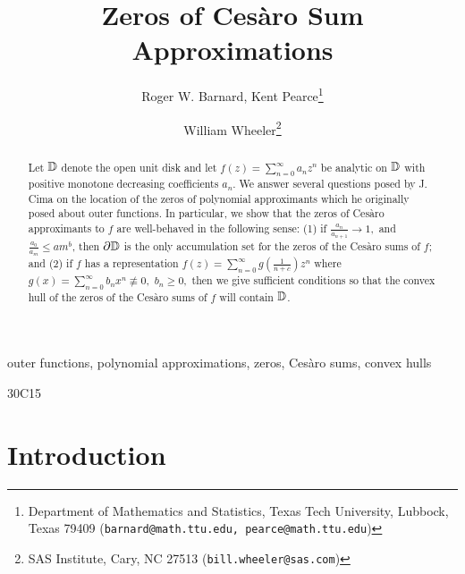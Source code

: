 \documentclass[final]{siamltex}
\title{\large Zeros of Ces\`{a}ro Sum Approximations}
\author{Roger W. Barnard, Kent Pearce\thanks{Department of 
Mathematics and Statistics,  Texas Tech University, 
Lubbock, Texas  79409 
({\tt barnard@math.ttu.edu, pearce@math.ttu.edu}) }
\and William Wheeler\thanks {SAS Institute, 
Cary, NC  27513
({\tt bill.wheeler@sas.com})}}
\begin{document}
\maketitle 

\begin{abstract}

Let ${\Bbb D}$ denote the open unit disk and let $f(z) = \sum_{n=0}^{\infty} a_{n} z^{n}$  be analytic on ${\Bbb D}$ with positive monotone decreasing coefficients  $a_{n}$.  We answer several questions posed by J. Cima on the location of the zeros of polynomial approximants which he originally posed about outer functions.  In particular, we show that the zeros of Ces\`{a}ro approximants to $f$ are well-behaved in the following sense:  (1) if $\frac{a_{n}}{a_{n+1}} \rightarrow 1,$ and  $\frac{a_{0}}{a_{m}} \leq am^{b}$, then $\partial{\Bbb D}$ is the only accumulation set for the zeros of the Ces\`{a}ro sums of $f$; and (2) if $f$ has a representation $ f(z) = \sum_{n=0}^{\infty} g \left( \frac{1}{n+c} \right) z^{n}$  where $g(x) = \sum_{n=0}^{\infty}b_{n}x^{n} \not\equiv 0,$ $b_{n} \geq 0,$ then we give sufficient conditions so that the convex hull of the zeros of the Ces\`{a}ro sums of $f$ will contain ${\Bbb D}$.
\end{abstract}


\begin{keywords} 
outer functions, polynomial approximations, zeros, Ces\`{a}ro sums, convex hulls
\end{keywords}

\begin{AMS}
30C15 
\end{AMS}

\pagestyle{myheadings}
\thispagestyle{plain}




\section{Introduction}
   
\end{document}
